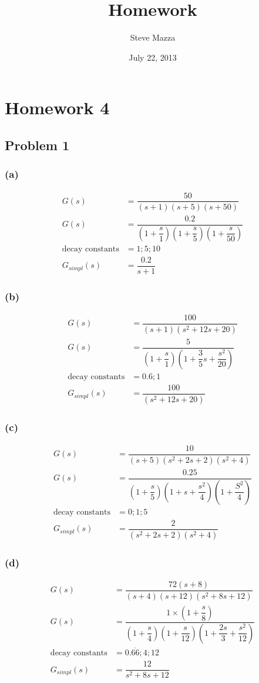 \documentclass[letterpaper,10pt]{article}
\title{Homework}
\author{Steve Mazza}
\date{July 22, 2013}
\begin{document}
\maketitle

\section*{Homework 4}
\subsection*{Problem 1}
\subsubsection*{(a)}
\begin{align*}
	G(s) &= \dfrac{50}{(s+1)(s+5)(s+50)} \\
	G(s) &= \dfrac{0.2}{\left(1+\dfrac{s}{1}\right)\left(1 + \dfrac{s}{5}\right)\left(1 + \dfrac{s}{50}\right)} \\
	\mbox{decay constants} &= 1;5;10 \\
	G_{simpl}(s) &= \dfrac{0.2}{s+1}
\end{align*}
\subsubsection*{(b)}
\begin{align*}
	G(s) &= \dfrac{100}{(s+1)(s^2+12s+20)} \\
	G(s) &= \dfrac{5}{\left(1+\dfrac{s}{1}\right)\left(1+\dfrac{3}{5}s+\dfrac{s^2}{20}\right)} \\
	\mbox{decay constants} &= 0.6;1\\
	G_{simpl}(s) &= \dfrac{100}{\left(s^2+12s+20\right)}
\end{align*}
\subsubsection*{(c)}
\begin{align*}
	G(s) &= \dfrac{10}{(s+5)(s^2+2s+2)(s^2+4)} \\
	G(s) &= \dfrac{0.25}{\left(1+\dfrac{s}{5}\right)\left(1+s+\dfrac{s^2}{4}\right)\left(1+\dfrac{S^2}{4}\right)} \\
	\mbox{decay constants} &= 0;1;5 \\
	G_{simpl}(s) &= \dfrac{2}{\left(s^2+2s+2\right)\left(s^2+4\right)}
\end{align*}
\subsubsection*{(d)}
\begin{align*}
	G(s) &= \dfrac{72(s+8)}{(s+4)(s+12)(s^2+8s+12)} \\
	G(s) &= \dfrac{1\times\left(1+\dfrac{s}{8}\right)}{\left(1+\dfrac{s}{4}\right)\left(1+\dfrac{s}{12}\right)\left(1+\dfrac{2s}{3}+\dfrac{s^2}{12}\right)} \\
	\mbox{decay constants} &= 0.\overline{66};4;12 \\
	G_{simpl}(s) &= \dfrac{12}{s^2+8s+12}
\end{align*}
\end{document}
